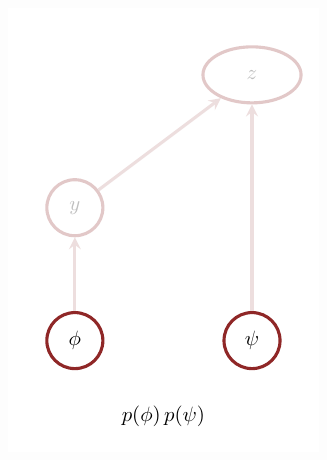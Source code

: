 \documentclass[
  letterpaper,
  DIV=11,
  numbers=noendperiod]{scrartcl}
\begin{document}
\begin{figure}
\begin{minipage}{0.25\linewidth}
{\captionsetup{labelsep=none}\includegraphics{figures/gms/conditioning/prior/prior.pdf}

}

\subcaption{\label{fig-gm-prior}}

\end{minipage}%
%
\begin{minipage}{0.25\linewidth}

\end{minipage}
\end{figure}
\end{document}
